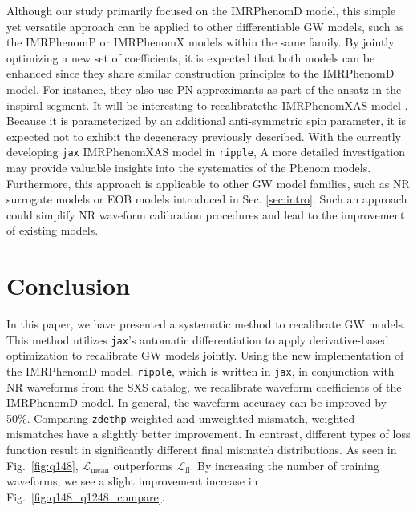 \documentclass[twocolumn]{aastex631}
\newcommand{\ripple}{\texttt{ripple}}
\newcommand{\jax}{\texttt{jax}}
\newcommand{\zdethp}{\texttt{zdethp}}
\begin{document}
Although our study primarily focused on the IMRPhenomD model, this simple yet
versatile approach can be applied to other differentiable GW models, such as the
IMRPhenomP \citep{hannam2014simple, khan2019phenomenological} or IMRPhenomX \citep{pratten2020setting,pratten2021computationally} 
models within the same family. By jointly optimizing a new set of coefficients,
it is expected that both models can be enhanced since they share similar
construction principles to the IMRPhenomD model. For instance, they also use PN
approximants as part of the ansatz in the inspiral segment. It will be interesting 
to recalibratethe IMRPhenomXAS model \citep{pratten2020setting}. Because it is
parameterized by an additional anti-symmetric spin parameter, it is expected not
to exhibit the degeneracy previously described. With the currently developing 
{\jax} IMRPhenomXAS model in {\ripple}, A more detailed investigation
may provide valuable insights into the systematics of the Phenom models.
Furthermore, this approach is applicable to other GW model families, such as NR
surrogate models or EOB models introduced in Sec. \ref{sec:intro}. Such an approach could 
simplify NR waveform calibration procedures and lead to the improvement of 
existing models.

\section{Conclusion} \label{sec:conclusion}

In this paper, we have presented a systematic method to recalibrate GW models.
This method utilizes {\jax}'s automatic differentiation to apply
derivative-based optimization to recalibrate GW models jointly. Using the new
implementation of the IMRPhenomD model, {\ripple}, which is written in \jax, in
conjunction with NR waveforms from the SXS catalog, we recalibrate waveform
coefficients of the IMRPhenomD model. In general, the waveform accuracy can be
improved by 50\%. Comparing {\zdethp} weighted and unweighted mismatch, weighted
mismatches have a slightly better improvement. In contrast, different types of
loss function result in significantly different final mismatch distributions. As 
seen in Fig.~\ref{fig:q148}, $\mathcal{L}_{\mathrm{mean}}$ outperforms 
$\mathcal{L}_{\mathrm{fl}}$. By increasing the number of training waveforms, we see a 
slight improvement increase in Fig.~\ref{fig:q148_q1248_compare}. 
\end{document}

